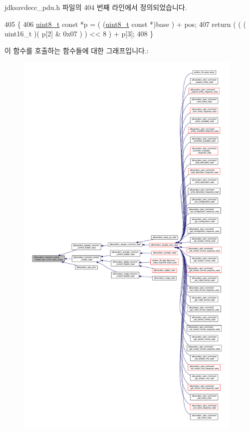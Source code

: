 jdksavdecc\+\_\+pdu.\+h 파일의 404 번째 라인에서 정의되었습니다.


\begin{DoxyCode}
405 \{
406     \hyperlink{stdint_8h_aba7bc1797add20fe3efdf37ced1182c5}{uint8\_t} \textcolor{keyword}{const} *p = ( (\hyperlink{stdint_8h_aba7bc1797add20fe3efdf37ced1182c5}{uint8\_t} \textcolor{keyword}{const} *)base ) + pos;
407     \textcolor{keywordflow}{return} ( ( ( uint16\_t )( p[2] & 0x07 ) ) << 8 ) + p[3];
408 \}
\end{DoxyCode}


이 함수를 호출하는 함수들에 대한 그래프입니다.\+:
\nopagebreak
\begin{figure}[H]
\begin{center}
\leavevmode
\includegraphics[height=550pt]{group__jdksavdecc__avtp__common__control__header_ga2d89ba7b9520f61839d222bdb2494e24_icgraph}
\end{center}
\end{figure}


